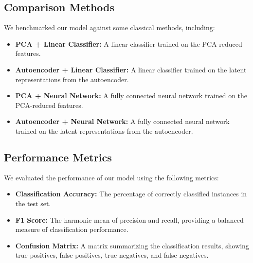 \documentclass[conference]{IEEEtran}
\begin{document}
\subsection{Comparison Methods}
We benchmarked our model against some
classical methods, including:
\begin{itemize}
    \item \textbf{PCA + Linear Classifier:} 
    A linear classifier trained on the PCA-reduced features.
    
    \item \textbf{Autoencoder + Linear Classifier:} 
    A linear classifier trained on the latent representations from the autoencoder.
    
    \item \textbf{PCA + Neural Network:}
    A fully connected neural network trained on the PCA-reduced features.
    
    \item \textbf{Autoencoder + Neural Network:}
    A fully connected neural network trained on the latent representations from the autoencoder.
\end{itemize}

\subsection{Performance Metrics}
We evaluated the performance of our model using the following metrics:
\begin{itemize}
    \item \textbf{Classification Accuracy:} 
    The percentage of correctly classified instances in the test set.
    
    \item \textbf{F1 Score:} 
    The harmonic mean of precision and recall, providing a balanced measure of classification performance.
    
    \item \textbf{Confusion Matrix:} 
    A matrix summarizing the classification results, showing true positives, false positives, true negatives, and false negatives.
    
\end{itemize}
\end{document}
